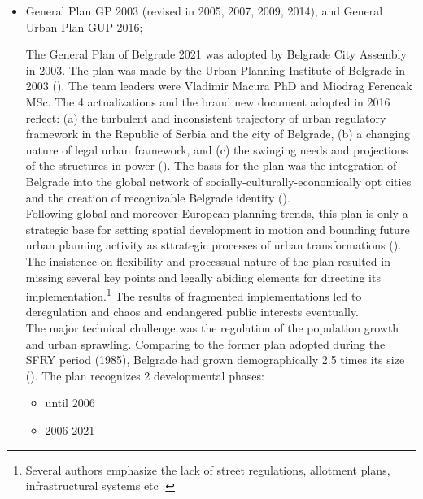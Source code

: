 \documentclass[11pt]{report}
\begin{document}
\begin{itemize}
\item General Plan GP 2003 (revised in 2005, 2007, 2009, 2014), and General Urban Plan GUP 2016;

The  General  Plan  of  Belgrade  2021 was adopted  by  Belgrade  City Assembly in 2003.
The plan was made by  the  Urban  Planning  Institute  of  Belgrade  in  2003 (\cite{ref Official Gazette of the City of Belgrade no 27/03}). The team leaders were Vladimir Macura PhD and Miodrag Ferencak MSc.
The 4 actualizations and the brand new document adopted in 2016 reflect:
(a) the turbulent and inconsistent trajectory of urban regulatory framework in the Republic of Serbia and the city of Belgrade,
(b) a changing nature of legal urban framework, and
(c) the swinging needs and projections of the structures in power
(\cite{Vukmirovic in Doytchinov et al 2015}).
The basis for the plan was the integration of Belgrade into the global network of socially-culturally-economically opt cities and the creation of recognizable Belgrade identity (\cite{ref}).
\\
Following global and moreover European planning trends, this plan is only a  strategic base for setting spatial development in motion and bounding future urban planning activity as sttrategic processes of urban transformations (\href{ref}{\citealt{grozdanic_belgrade_2008}}).
The insistence on flexibility and processual nature of the plan resulted in missing several key points and legally abiding elements for directing its implementation.\footnote{Several authors emphasize the lack of street regulations,  allotment plans, infrastructural systems etc \cite{ref}.}
The results of fragmented implementations led to deregulation and chaos and endangered public interests eventually.
\\
The major technical challenge was the regulation of the population growth and urban sprawling.
Comparing to the former plan adopted during the SFRY period (1985), Belgrade had grown demographically 2.5 times its size (\cite{ref}).
The plan recognizes 2 developmental phases:

\begin{itemize}
\item until 2006
\item 2006-2021
\end{itemize}


\end{itemize}
\end{document}
